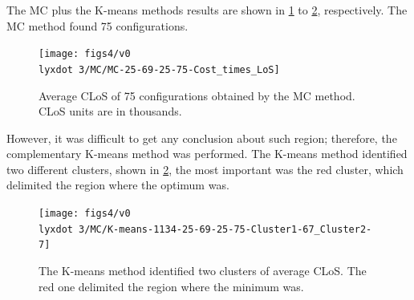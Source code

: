 \documentclass[11pt]{article} %
\begin{document}
The MC plus the K-means methods results are shown in \ref{subfig:mc4-3}
to \ref{subfig:km4-3}, respectively. The MC method found 75 configurations.
\begin{figure}[H]
\centering{}\texttt{[image: figs4/v0\\lyxdot 3/MC/MC-25-69-25-75-Cost\_times\_LoS]}\caption{Average CLoS of 75 configurations obtained by the MC method. CLoS
units are in thousands. \label{subfig:mc4-3}}
\end{figure}
However, it was difficult to get any conclusion about such region;
therefore, the complementary K-means method was performed. The K-means
method identified two different clusters, shown in \ref{subfig:km4-3},
the most important was the red cluster, which delimited the region
where the optimum was. %

\begin{figure}[H]
\begin{centering}
\texttt{[image: figs4/v0\\lyxdot 3/MC/K-means-1134-25-69-25-75-Cluster1-67\_Cluster2-7]}
\par\end{centering}

\caption{The K-means method identified two clusters of average CLoS. The red
one delimited the region where the minimum was. \label{subfig:km4-3}}
\end{figure}
\end{document}
